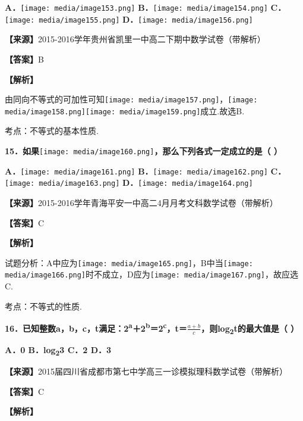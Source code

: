 \textbf{A．}\texttt{[image: media/image153.png]}
\textbf{B．}\texttt{[image: media/image154.png]}
\textbf{C．}\texttt{[image: media/image155.png]}
\textbf{D．}\texttt{[image: media/image156.png]}

\textbf{【来源】}2015-2016学年贵州省凯里一中高二下期中数学试卷（带解析）

\textbf{【答案】}B

\textbf{【解析】}

由同向不等式的可加性可知\texttt{[image: media/image157.png]}，\texttt{[image: media/image158.png]}\texttt{[image: media/image159.png]}成立.故选B.

考点：不等式的基本性质.

\textbf{15．如果}\texttt{[image: media/image160.png]}\textbf{，那么下列各式一定成立的是（
）}

\textbf{A．}\texttt{[image: media/image161.png]}
\textbf{B．}\texttt{[image: media/image162.png]}
\textbf{C．}\texttt{[image: media/image163.png]}
\textbf{D．}\texttt{[image: media/image164.png]}

\textbf{【来源】}2015-2016学年青海平安一中高二4月月考文科数学试卷（带解析）

\textbf{【答案】}C

\textbf{【解析】}

试题分析：A中应为\texttt{[image: media/image165.png]}，B中当\texttt{[image: media/image166.png]}时不成立，D应为\texttt{[image: media/image167.png]}，故应选C.

考点：不等式的性质.

\textbf{16．已知整数a，b，c，t满足：2\textsuperscript{a}＋2\textsuperscript{b}＝2\textsuperscript{c}，t＝}\(\frac{a + b}{c}\)\textbf{，则log\textsubscript{2}t的最大值是（
）}

\textbf{A．0 B．log\textsubscript{2}3 C．2 D．3}

\textbf{【来源】}2015届四川省成都市第七中学高三一诊模拟理科数学试卷（带解析）

\textbf{【答案】}C

\textbf{【解析】}

